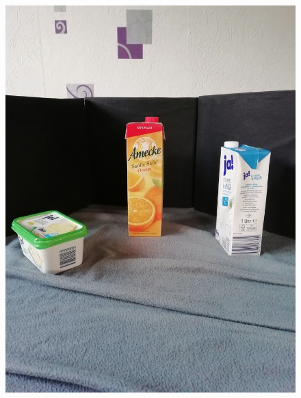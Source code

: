 \documentclass[a4paper,12pt,oneside]{article}
\begin{document}
\begin{figure}[htb]
\begin{minipage}[c]{0.2\textwidth}
\includegraphics[width=\textwidth]{Sources/Bild2_GW.jpg}
\end{minipage}
\hfill
\begin{minipage}[c]{0.08\textwidth}

\end{minipage}
\end{figure}
\end{document}

